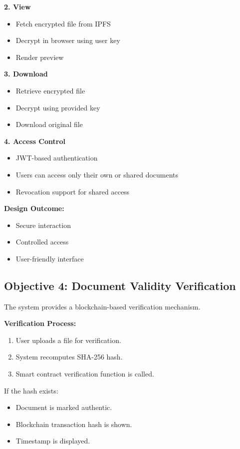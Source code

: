 \documentclass[12pt]{article}
\begin{document}
\textbf{2. View}
\begin{itemize}
\item Fetch encrypted file from IPFS
\item Decrypt in browser using user key
\item Render preview
\end{itemize}

\textbf{3. Download}
\begin{itemize}
\item Retrieve encrypted file
\item Decrypt using provided key
\item Download original file
\end{itemize}

\textbf{4. Access Control}
\begin{itemize}
\item JWT-based authentication
\item Users can access only their own or shared documents
\item Revocation support for shared access
\end{itemize}

\textbf{Design Outcome:}

\begin{itemize}
\item Secure interaction
\item Controlled access
\item User-friendly interface
\end{itemize}

\subsection{Objective 4: Document Validity Verification}

The system provides a blockchain-based verification mechanism.

\textbf{Verification Process:}

\begin{enumerate}
\item User uploads a file for verification.
\item System recomputes SHA-256 hash.
\item Smart contract verification function is called.
\end{enumerate}

If the hash exists:

\begin{itemize}
\item Document is marked authentic.
\item Blockchain transaction hash is shown.
\item Timestamp is displayed.
\end{itemize}
\end{document}
